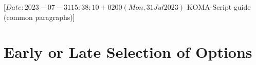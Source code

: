 %
%
%
%
%
%
%

                 [$Date: 2023-07-31 15:38:10 +0200 (Mon, 31 Jul 2023) $
                  KOMA-Script guide (common paragraphs)]

\section{Early or Late Selection of Options}
\BeginIndexGroup
{}%

